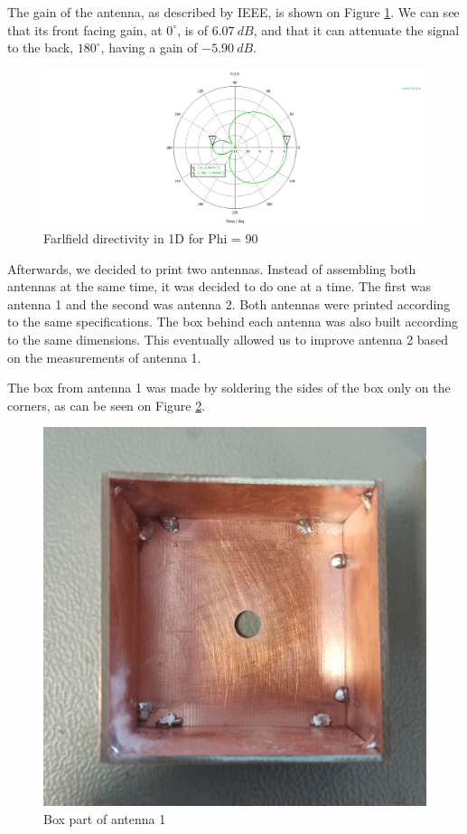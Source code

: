 \par The gain of the antenna, as described by IEEE, is shown on Figure \ref{fig:ch3_gain.png}. We can see that its front facing gain, at $0^{\circ}$, is of $6.07\:\si{dB}$, and that it can attenuate the signal to the back, $180^{\circ}$, having a gain of $-5.90\:\si{dB}$.

\begin{figure}[H]
    \vspace*{0cm}
    \centering
    \includegraphics[width=0.9\linewidth]{figs/ch3_gain.png}
    \caption{Farlfield directivity in 1D for Phi = 90}
    \label{fig:ch3_gain.png}
\end{figure}

\par Afterwards, we decided to print two antennas. Instead of assembling both antennas at the same time, it was decided to do one at a time. The first was antenna 1 and the second was antenna 2. Both antennas were printed according to the same specifications. The box behind each antenna was also built according to the same dimensions. This eventually allowed us to improve antenna 2 based on the measurements of antenna 1.

\par The box from antenna 1 was made by soldering the sides of the box only on the corners, as can be seen on Figure \ref{fig:ch3_antenna1Box.jpg}. 

\begin{figure}[H]
    \vspace*{0cm}
    \centering
    \includegraphics[width=0.3\linewidth]{figs/ch3_antenna1Box.jpg}
    \caption{Box part of antenna 1}
    \label{fig:ch3_antenna1Box.jpg}
\end{figure}

